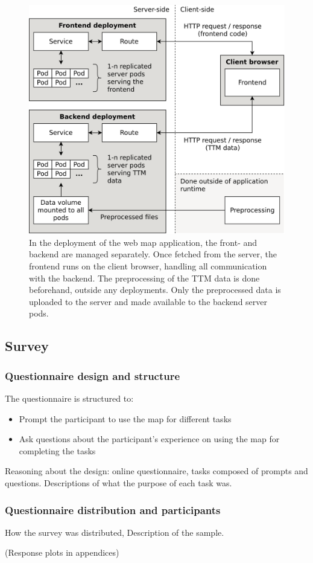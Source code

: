 \begin{figure}[H]
	\centering
	\includegraphics[width=\diagramwidth]{visual/figures/diagrams/architecture.png}
	\caption{
		In the deployment of the web map application,
		the front- and backend are managed separately.
		Once fetched from the server,
		the frontend runs on the client browser,
		handling all communication with the backend.
		The preprocessing of the TTM data is done beforehand, outside any deployments.
		Only the preprocessed data is uploaded to the server and made available to the
		backend server pods.
	}
	\label{fig:architechture}
\end{figure}


\subsection{Survey}

\subsubsection{Questionnaire design and structure}

The questionnaire is structured to:
\begin{itemize}
	\item Prompt the participant to use the map for different tasks
	\item Ask questions about the participant's experience
	on using the map for completing the tasks
\end{itemize}

Reasoning about the design: online questionnaire, tasks composed of prompts and questions.
Descriptions of what the purpose of each task was.

\subsubsection{Questionnaire distribution and participants}
How the survey was distributed,
Description of the sample.

(Response plots in appendices)
